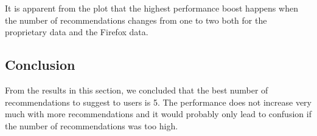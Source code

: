 It is apparent from the plot that the highest performance boost happens when the number of recommendations changes from one to two both for the proprietary data and the Firefox data. 

\subsection{Conclusion}

From the results in this section, we concluded that the best number of recommendations to suggest to users is 5. The performance does not increase very much with more recommendations and it would probably only lead to confusion if the number of recommendations was too high.